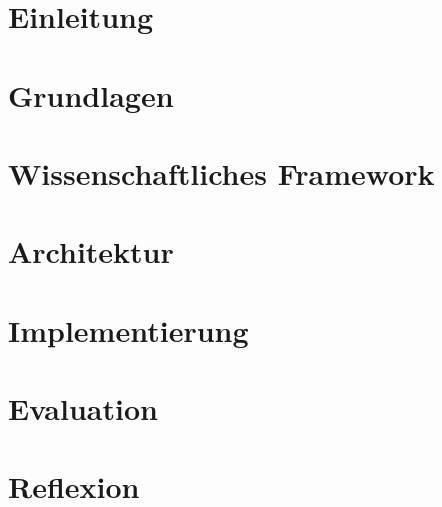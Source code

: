 	\chapter{Einleitung}
		\label{chap:einleitung}
		
	
	\chapter{Grundlagen}
		\label{chap:grundlagen}
		
		
	\chapter{Wissenschaftliches Framework}
		\label{chap:wissenschaftliches_framework}
		
		
	\chapter{Architektur}
		\label{chap:architektur}
		
		
	\chapter{Implementierung}
		\label{chap:implementierung}
		
		
	\chapter{Evaluation}
		\label{chap:evaluation}
		
		
	\chapter{Reflexion}
		\label{chap:reflexion}
		


	\clearpage
	\pagestyle{plain}
	\printbibliography

